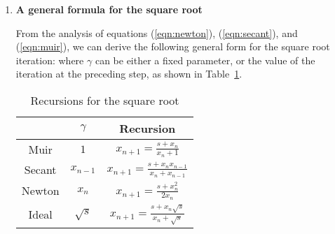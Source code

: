 \begin {enumerate}
\par
Another possible iterative relation for the square root is Francis
Muir's, described by Jon Claerbout :
\beq \label{eqn:muir}
 \eeq
\par
This relation belongs to the same family of iterative schemes as
Newton and Secant, if we make the following special choice of the
function $f(x)$ in (\ref{eqn:newton-raphson}):
\beq \label{eqn:muf} 
f(x)= 
|x+|^{}
|x-|^{} \eeq
\par
Figure~\ref{fig:muf} is a graphical representation of the
function f(x).
\item {\bf A general formula for the square root}
\par
From the analysis of equations (\ref{eqn:newton}), (\ref{eqn:secant}),
and (\ref{eqn:muir}), we can derive the following general form for 
the square root iteration:
\beq \label{eqn:general}
 \eeq
where $\gamma$ can be either a fixed parameter, or the value of the
iteration at the preceding step, as shown in Table~\ref{recursion}. 
\begin{table} \center
\caption{Recursions for the square root}
\label{recursion}
\begin{tabular}{|c|c|c|}\hline
\R        & $\gamma$   & Recursion \\\hline
\R Muir   & $1$        & $x_{n+1}=\frac{s+x_n        }{x_n+1       }$ \\\hline
\R Secant & $x_{n-1}$  & $x_{n+1}=\frac{s+x_n x_{n-1}}{x_n+x_{n-1} }$ \\\hline
\R Newton & $x_n$      & $x_{n+1}=\frac{s+x_n^2      }{2  x_n      }$ \\\hline
\R Ideal  & $\sqrt{s}$ & $x_{n+1}=\frac{s+x_n\sqrt{s}}{x_n+\sqrt{s}}$ \\\hline
\end{tabular}
\end{table}

\end{enumerate}
